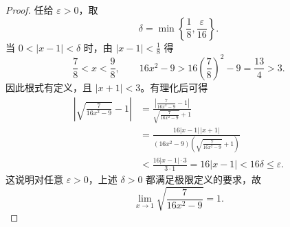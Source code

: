 \documentclass{ctexart}
\begin{document}
\begin{proof}

任给 $\varepsilon>0$，取
\[
  \delta=\min\left\{\frac18,\frac{\varepsilon}{16}\right\}.
\]
当 $0<|x-1|<\delta$ 时，由 $|x-1|<\frac18$ 得
\[
  \frac78<x<\frac98,
  \qquad
  16x^2-9>16\left(\frac78\right)^2-9=\frac{13}{4}>3.
\]
因此根式有定义，且 $|x+1|<3$。有理化后可得
\begin{align*}
  \left|\sqrt{\frac{7}{16x^2-9}}-1\right|
  &=\frac{\left|\frac{7}{16x^2-9}-1\right|}
          {\sqrt{\frac{7}{16x^2-9}}+1}\\
  &=\frac{16|x-1|\,|x+1|}
          {(16x^2-9)\left(\sqrt{\frac{7}{16x^2-9}}+1\right)}\\
  &<\frac{16|x-1|\cdot3}{3\cdot1}
   =16|x-1|
   <16\delta
   \leq\varepsilon.
\end{align*}
这说明对任意 $\varepsilon>0$，上述 $\delta>0$ 都满足极限定义的要求，故
\[
  \lim_{x\to1}\sqrt{\frac{7}{16x^2-9}}=1.
\]
\end{proof}
\end{document}
